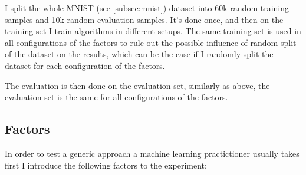 \documentclass{article}
\begin{document}
I split the whole MNIST (see \ref{subsec:mnist}) dataset into 60k random training samples and 10k random evaluation samples. It's done once, and then on the training set I train algorithms in different setups. The same training set is used in all configurations of the factors to rule out the possible influence of random split of the dataset on the results, which can be the case if I randomly split the dataset for each configuration of the factors.

The evaluation is then done on the evaluation set, similarly as above, the evaluation set is the same for all configurations of the factors.

\subsection{Factors}
In order to test a generic approach a machine learning practictioner usually takes first I introduce the following factors to the experiment:
\end{document}
